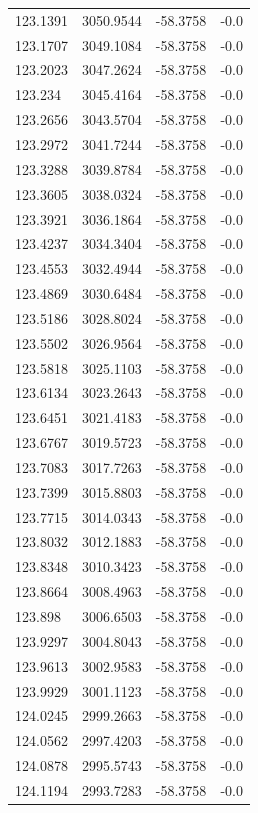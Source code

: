 \begin{table}[H]
\begin{tabular}{llll}
123.1391 & 3050.9544 & -58.3758 & -0.0 \\
123.1707 & 3049.1084 & -58.3758 & -0.0 \\
123.2023 & 3047.2624 & -58.3758 & -0.0 \\
123.234 & 3045.4164 & -58.3758 & -0.0 \\
123.2656 & 3043.5704 & -58.3758 & -0.0 \\
123.2972 & 3041.7244 & -58.3758 & -0.0 \\
123.3288 & 3039.8784 & -58.3758 & -0.0 \\
123.3605 & 3038.0324 & -58.3758 & -0.0 \\
123.3921 & 3036.1864 & -58.3758 & -0.0 \\
123.4237 & 3034.3404 & -58.3758 & -0.0 \\
123.4553 & 3032.4944 & -58.3758 & -0.0 \\
123.4869 & 3030.6484 & -58.3758 & -0.0 \\
123.5186 & 3028.8024 & -58.3758 & -0.0 \\
123.5502 & 3026.9564 & -58.3758 & -0.0 \\
123.5818 & 3025.1103 & -58.3758 & -0.0 \\
123.6134 & 3023.2643 & -58.3758 & -0.0 \\
123.6451 & 3021.4183 & -58.3758 & -0.0 \\
123.6767 & 3019.5723 & -58.3758 & -0.0 \\
123.7083 & 3017.7263 & -58.3758 & -0.0 \\
123.7399 & 3015.8803 & -58.3758 & -0.0 \\
123.7715 & 3014.0343 & -58.3758 & -0.0 \\
123.8032 & 3012.1883 & -58.3758 & -0.0 \\
123.8348 & 3010.3423 & -58.3758 & -0.0 \\
123.8664 & 3008.4963 & -58.3758 & -0.0 \\
123.898 & 3006.6503 & -58.3758 & -0.0 \\
123.9297 & 3004.8043 & -58.3758 & -0.0 \\
123.9613 & 3002.9583 & -58.3758 & -0.0 \\
123.9929 & 3001.1123 & -58.3758 & -0.0 \\
124.0245 & 2999.2663 & -58.3758 & -0.0 \\
124.0562 & 2997.4203 & -58.3758 & -0.0 \\
124.0878 & 2995.5743 & -58.3758 & -0.0 \\
124.1194 & 2993.7283 & -58.3758 & -0.0 \\

\end{tabular}
\end{table}
